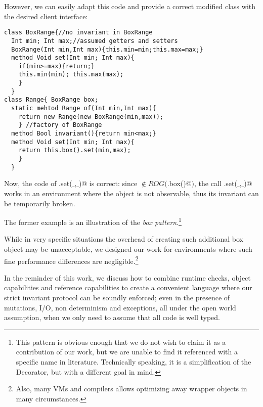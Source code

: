 However, we can easily adapt this code and provide a correct modified
\Q@Range@ class with the desired client interface:
\begin{lstlisting}
class BoxRange{//no invariant in BoxRange
  Int min; Int max;//assumed getters and setters
  BoxRange(Int min,Int max){this.min=min;this.max=max;}
  method Void set(Int min; Int max){
    if(min>=max){return;}
    this.min(min); this.max(max);
    }
  }
class Range{ BoxRange box;
  static mehtod Range of(Int min,Int max){
    return new Range(new BoxRange(min,max));
    } //factory of BoxRange
  method Bool invariant(){return min<max;}
  method Void set(Int min; Int max){
    return this.box().set(min,max);
    }
  }
\end{lstlisting}
Now, the code of \Q@Range.set($\_$,$\_$)@ is correct:
  since \Q@this@ $\notin \mathit{ROG}($\Q@this.box()@$)$, the call
\Q@BoxRange.set($\_$,$\_$)@ works in an environment where the \Q@Range@ object is
not observable, thus its invariant can be temporarily broken.

The former example is an illustration of the \emph{box pattern}.\footnote{
This pattern is obvious enough that we do not wish to claim it as a contribution of our work,
but we are unable to find it referenced with a specific name in literature. Technically speaking, it is a simplification of the Decorator, but with a different goal in mind.}

While in very specific situations the overhead of creating such additional box object may be unacceptable, 
we designed our work for environments where such fine performance differences are negligible.\footnote{
Also, many VMs and compilers allows optimizing away wrapper objects in many circumstances.\cite{help}}

In the reminder of this work, we discuss how to combine runtime
checks, object capabilities  and
reference capabilities to create a convenient language where our
strict invariant protocol can
be soundly enforced; even in the presence of mutations, I/O, non
determinism and exceptions, all under the open world assumption, when
we only need to assume that all code is well typed.



